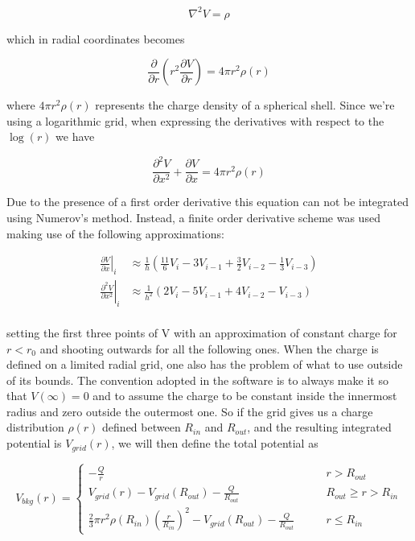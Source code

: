 \documentclass[]{report}
\begin{document}
\begin{equation}
\nabla^2 V = \rho
\end{equation}

which in radial coordinates becomes

\begin{equation}
	\frac{\partial}{\partial r}\left(r^2	\frac{\partial V}{\partial r}\right) = 4\pi r^2 \rho(r)
\end{equation}

where $4\pi r^2 \rho(r)$ represents the charge density of a spherical shell. Since we're using a logarithmic grid, when expressing the derivatives with respect to the $\log(r)$ we have

\begin{equation}
\frac{\partial^2 V}{\partial x^2} + \frac{\partial V}{\partial x}= 4\pi r^2 \rho(r)
\end{equation}

Due to the presence of a first order derivative this equation can not be integrated using Numerov's method. Instead, a finite order derivative scheme was used making use of the following approximations:

\begin{align}
\left.\frac{\partial V}{\partial x}\right|_i &\approx \frac{1}{h}\left(\frac{11}{6}V_i -3V_{i-1} +\frac{3}{2}V_{i-2}-\frac{1}{3}V_{i-3} \right) \\
\left.\frac{\partial^2 V}{\partial x^2}\right|_i &\approx \frac{1}{h^2}\left(2V_i -5V_{i-1} +4V_{i-2}-V_{i-3} \right) \\
\end{align}

setting the first three points of V with an approximation of constant charge for $r < r_0$ and shooting outwards for all the following ones.\newline 
When the charge is defined on a limited radial grid, one also has the problem of what to use outside of its bounds. The convention adopted in the software is to always make it so that $V(\infty) = 0$ and to assume the charge to be constant inside the innermost radius and zero outside the outermost one. So if the grid gives us a charge distribution $\rho(r)$ defined between $R_{in}$ and $R_{out}$, and the resulting integrated potential is $V_{grid}(r)$, we will then define the total potential as

\begin{equation}
V_{bkg}(r) = \begin{cases}
-\frac{Q}{r}\qquad & r > R_{out} \\
V_{grid}(r) -V_{grid}(R_{out}) - \frac{Q}{R_{out}} \qquad & R_{out} \geq r > R_{in} \\
\frac{2}{3}\pi r^2\rho(R_{in})\left(\frac{r}{R_{in}}\right)^2-V_{grid}(R_{out}) - \frac{Q}{R_{out}} \qquad & r \leq R_{in}
\end{cases}
\end{equation} 
\end{document}
